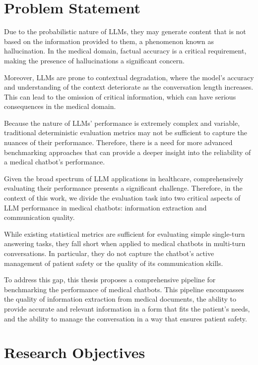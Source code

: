\section{Problem Statement}

Due to the probabilistic nature of LLMs, they may generate content that is not based on the information provided to them, a phenomenon known as hallucination. In the medical domain, factual accuracy is a critical requirement, making the presence of hallucinations a significant concern.

Moreover, LLMs are prone to contextual degradation, where the model's accuracy and understanding of the context deteriorate as the conversation length increases. This can lead to the omission of critical information, which can have serious consequences in the medical domain.

Because the nature of LLMs' performance is extremely complex and variable, traditional deterministic evaluation metrics may not be sufficient to capture the nuances of their performance. Therefore, there is a need for more advanced benchmarking approaches that can provide a deeper insight into the reliability of a medical chatbot's performance.

Given the broad spectrum of LLM applications in healthcare, comprehensively evaluating their performance presents a significant challenge. Therefore, in the context of this work, we divide the evaluation task into two critical aspects of LLM performance in medical chatbots: information extraction and communication quality. 

While existing statistical metrics are sufficient for evaluating simple single-turn answering tasks, they fall short when applied to medical chatbots in multi-turn conversations. In particular, they do not capture the chatbot's active management of patient safety or the quality of its communication skills.

To address this gap, this thesis proposes a comprehensive pipeline for benchmarking the performance of medical chatbots. This pipeline encompasses the quality of information extraction from medical documents, the ability to provide accurate and relevant information in a form that fits the patient's needs, and the ability to manage the conversation in a way that ensures patient safety.

\section{Research Objectives}

